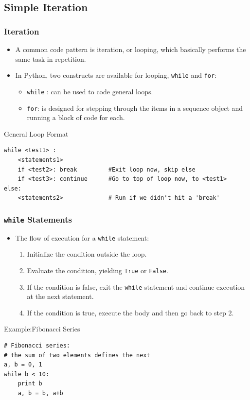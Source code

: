 \documentclass{beamer}
\begin{document}
\subsection{Simple Iteration}
\begin{frame}[fragile]
\frametitle{Iteration}
\begin{itemize} 
\item A common code pattern is \alert{iteration}, or \alert{looping}, which basically performs the same task in repetition.
\item In Python, two constructs are available for looping, \texttt{while} and \texttt{for}: 
\begin{itemize}
\item \texttt{while} : can be used to code \alert{general loops}.
\item \texttt{for}: is designed for stepping through the items in a \alert{ sequence object} and running a block of code for each. 
\end{itemize}
\end{itemize}
\begin{block}{General Loop Format}
\tiny
\begin{verbatim}
while <test1> :
    <statements1>
    if <test2>: break         #Exit loop now, skip else
    if <test3>: continue      #Go to top of loop now, to <test1>
else:
    <statements2>             # Run if we didn't hit a 'break'    
\end{verbatim}
\end{block}
\end{frame}
\begin{frame}[fragile]
\frametitle{\texttt{while} Statements}
\begin{itemize}
\item The flow of execution for a {\tt while} statement:

\begin{enumerate}
\item Initialize the  condition \alert{outside} the loop.
\item Evaluate the condition, yielding {\tt True} or {\tt False}.

\item If the condition is false, exit the {\tt while} statement
and continue execution at the next statement.

\item If the condition is true, execute the
body and then go back to step 2.
\end{enumerate}
\end{itemize}
\begin{block}{Example:Fibonacci Series}
\tiny
\begin{verbatim}
# Fibonacci series:
# the sum of two elements defines the next
a, b = 0, 1
while b < 10:
    print b
    a, b = b, a+b
\end{verbatim}
\end{block}
\end{frame}
\end{document}
